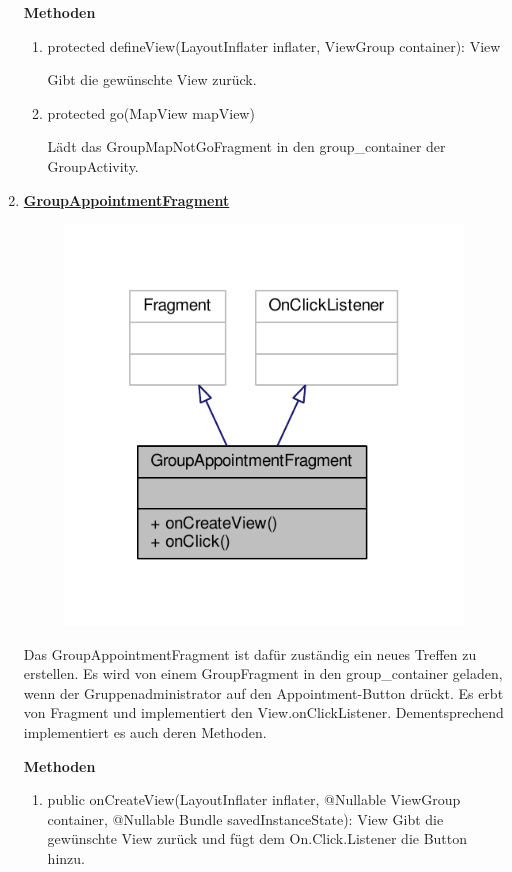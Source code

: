 \begin{enumerate}
	\textbf{Methoden}
	\begin{enumerate}
		\item protected defineView(LayoutInflater inflater, ViewGroup container): View

		Gibt die gewünschte View zurück.

		\item protected go(MapView mapView)

		Lädt das GroupMapNotGoFragment in den group\_container der GroupActivity.

	\end{enumerate}

	\item \textbf{\underline{GroupAppointmentFragment}}

	\begin{figure}[H]
		\includegraphics[scale = 1]{res/group_appointment_fragment__inherit__graph.pdf}
		\centering
	\end{figure}
	Das GroupAppointmentFragment ist dafür zuständig ein neues Treffen zu erstellen. Es wird von einem GroupFragment in den group\_container geladen, wenn der Gruppenadministrator auf den Appointment-Button drückt. Es erbt von Fragment und implementiert den View.onClickListener. Dementsprechend implementiert es auch deren Methoden.
	
	\textbf{Methoden}
	\begin{enumerate}
		\item public onCreateView(LayoutInflater inflater, @Nullable ViewGroup container, @Nullable Bundle savedInstanceState): View
			Gibt die gewünschte View zurück und fügt dem On.Click.Listener die Button hinzu.
			

\end{enumerate}
\end{enumerate}
